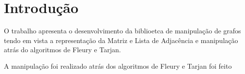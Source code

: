 \chapter{Introdução}
\label{intro}

O trabalho apresenta o desenvolvimento da biblioetca de manipulação de 
grafos tendo em vista a representação da Matriz e Lista de Adjacência e 
manipulação atrás do algoritmos de Fleury e Tarjan.

A manipulação foi realizado atrás dos algoritmos de Fleury e Tarjan foi 
feito 

